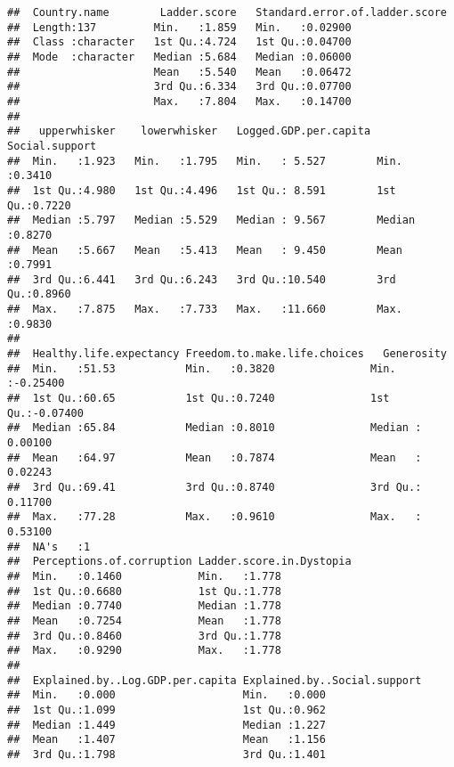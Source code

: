 \documentclass[
]{article}
\begin{document}
\begin{verbatim}
##  Country.name        Ladder.score   Standard.error.of.ladder.score
##  Length:137         Min.   :1.859   Min.   :0.02900               
##  Class :character   1st Qu.:4.724   1st Qu.:0.04700               
##  Mode  :character   Median :5.684   Median :0.06000               
##                     Mean   :5.540   Mean   :0.06472               
##                     3rd Qu.:6.334   3rd Qu.:0.07700               
##                     Max.   :7.804   Max.   :0.14700               
##                                                                   
##   upperwhisker    lowerwhisker   Logged.GDP.per.capita Social.support  
##  Min.   :1.923   Min.   :1.795   Min.   : 5.527        Min.   :0.3410  
##  1st Qu.:4.980   1st Qu.:4.496   1st Qu.: 8.591        1st Qu.:0.7220  
##  Median :5.797   Median :5.529   Median : 9.567        Median :0.8270  
##  Mean   :5.667   Mean   :5.413   Mean   : 9.450        Mean   :0.7991  
##  3rd Qu.:6.441   3rd Qu.:6.243   3rd Qu.:10.540        3rd Qu.:0.8960  
##  Max.   :7.875   Max.   :7.733   Max.   :11.660        Max.   :0.9830  
##                                                                        
##  Healthy.life.expectancy Freedom.to.make.life.choices   Generosity      
##  Min.   :51.53           Min.   :0.3820               Min.   :-0.25400  
##  1st Qu.:60.65           1st Qu.:0.7240               1st Qu.:-0.07400  
##  Median :65.84           Median :0.8010               Median : 0.00100  
##  Mean   :64.97           Mean   :0.7874               Mean   : 0.02243  
##  3rd Qu.:69.41           3rd Qu.:0.8740               3rd Qu.: 0.11700  
##  Max.   :77.28           Max.   :0.9610               Max.   : 0.53100  
##  NA's   :1                                                              
##  Perceptions.of.corruption Ladder.score.in.Dystopia
##  Min.   :0.1460            Min.   :1.778           
##  1st Qu.:0.6680            1st Qu.:1.778           
##  Median :0.7740            Median :1.778           
##  Mean   :0.7254            Mean   :1.778           
##  3rd Qu.:0.8460            3rd Qu.:1.778           
##  Max.   :0.9290            Max.   :1.778           
##                                                    
##  Explained.by..Log.GDP.per.capita Explained.by..Social.support
##  Min.   :0.000                    Min.   :0.000               
##  1st Qu.:1.099                    1st Qu.:0.962               
##  Median :1.449                    Median :1.227               
##  Mean   :1.407                    Mean   :1.156               
##  3rd Qu.:1.798                    3rd Qu.:1.401               

\end{verbatim}
\end{document}
